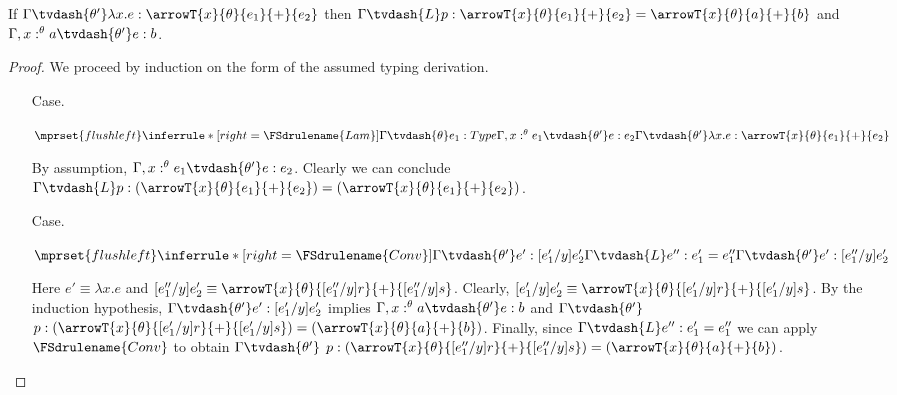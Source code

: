\begin{lemma}[Inversion]
  \label{lemma:inversion}
  If $\Gamma \tvdash{\theta'} \lambda x.e:\arrowT{x}{\theta}{e_1}{+}{e_2}$ 
  then 
  $\Gamma \tvdash{L} p:\arrowT{x}{\theta}{e_1}{+}{e_2} = \arrowT{x}{\theta}{a}{+}{b}$
  and
  $\Gamma,x:^\theta a \tvdash{\theta'} e:b$.
\end{lemma}
\begin{proof}
  We proceed by induction on the form of the assumed typing derivation.
  \begin{itemize}
  \item[Case.]\ \\
    \begin{center}
      \begin{math}
        $$\mprset{flushleft}
        \inferrule* [right=\FSdrulename{Lam}] {
          \Gamma \tvdash{\theta} e_1:Type
          \\\\
          \Gamma,x:^{\theta} e_1 \tvdash{\theta'} e:e_2
        }{\Gamma \tvdash{\theta'} \lambda x.e:\arrowT{x}{\theta}{e_1}{+}{e_2}}
      \end{math}
    \end{center}
    By assumption, $\Gamma,x:^{\theta} e_1 \tvdash{\theta'} e:e_2$.  Clearly we can conclude
    $\Gamma \tvdash{L} p:(\arrowT{x}{\theta}{e_1}{+}{e_2}) = (\arrowT{x}{\theta}{e_1}{+}{e_2})$.
    
  \item[Case.]\ \\
    \begin{center}
      \begin{math}
        $$\mprset{flushleft}
        \inferrule* [right=\FSdrulename{Conv}] {
          \Gamma \tvdash{\theta'} e':[e'_1/y]e'_2
          \\\\
          \Gamma \tvdash{L} e'':e'_1 = e''_1
        }{\Gamma \tvdash{\theta'} e':[e''_1/y]e'_2}
      \end{math}
    \end{center}
    Here $e' \equiv \lambda x.e$ and 
    $[e''_1/y]e'_2 \equiv \arrowT{x}{\theta}{[e''_1/y]r}{+}{[e''_1/y]s}$.  Clearly,
    $[e'_1/y]e'_2 \equiv \arrowT{x}{\theta}{[e'_1/y]r}{+}{[e'_1/y]s}$.  By the induction
    hypothesis, $\Gamma \tvdash{\theta'} e':[e'_1/y]e'_2$ implies 
    $\Gamma,x:^\theta a \tvdash{\theta'} e:b$ and 
    $\Gamma \tvdash{\theta'} $
    $p:(\arrowT{x}{\theta}{[e'_1/y]r}{+}{[e'_1/y]s}) = (\arrowT{x}{\theta}{a}{+}{b})$.  Finally, 
    since $\Gamma \tvdash{L} e'':e'_1 = e''_1$ we can apply $\FSdrulename{Conv}$ to obtain
    $\Gamma \tvdash{\theta'} $
    $p:(\arrowT{x}{\theta}{[e''_1/y]r}{+}{[e''_1/y]s}) = (\arrowT{x}{\theta}{a}{+}{b})$.
  \end{itemize}
\end{proof}

